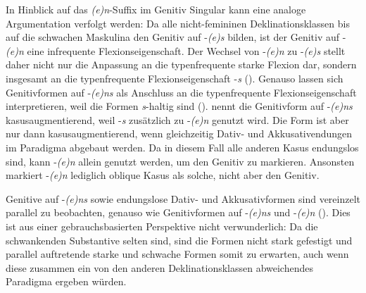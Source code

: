 In Hinblick auf das \textit{(e)n}-Suffix im Genitiv Singular kann eine analoge Argumentation verfolgt werden: Da alle nicht-femininen Deklinationsklassen bis auf die schwachen Maskulina den Genitiv auf -\textit{(e)s} bilden, ist der Genitiv auf -\textit{(e)n} eine infrequente Flexionseigenschaft. Der Wechsel von -\textit{(e)n} zu -\textit{(e)s} stellt daher nicht nur die Anpassung an die typenfrequente starke Flexion dar, sondern insgesamt an die typenfrequente Flexionseigenschaft -\textit{s} (\cite[113--114]{Thieroff.2003}). Genauso lassen sich Genitivformen auf -\textit{(e)ns} als Anschluss an die typenfrequente Flexionseigenschaft interpretieren, weil die Formen \textit{s}-haltig sind (\cite[113--114]{Thieroff.2003}). \textcite[58--59]{Krischke.2012} nennt die Genitivform auf -\textit{(e)ns} kasusaugmentierend, weil -\textit{s} zusätzlich zu -\textit{(e)n} genutzt wird. Die Form ist aber nur dann kasusaugmentierend, wenn gleichzeitig Dativ- und Akkusativendungen im Paradigma abgebaut werden. Da in diesem Fall alle anderen Kasus endungslos sind, kann -\textit{(e)n} allein genutzt werden, um den Genitiv zu markieren. Ansonsten markiert -\textit{(e)n} lediglich oblique Kasus als solche, nicht aber den Genitiv.



Genitive auf -\textit{(e)ns} sowie endungslose Dativ- und Akkusativformen sind vereinzelt parallel zu beobachten, genauso wie Genitivformen auf -\textit{(e)ns} und -\textit{(e)n} (\cite[71]{Krischke.2012}). Dies ist aus einer gebrauchsbasierten Perspektive nicht verwunderlich: Da die schwankenden Substantive selten sind, sind die Formen nicht stark gefestigt und parallel auftretende starke und schwache Formen somit zu erwarten, auch wenn diese zusammen ein von den anderen Deklinationsklassen abweichendes Paradigma ergeben würden.  



